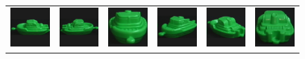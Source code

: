 \begin{figure}[p]
\begin{center}
\begin{tabular}{cccccc}
\includegraphics[width=2cm]{coil/beeld-54.eps} &
\includegraphics[width=2cm]{coil/beeld-55.eps} &
\includegraphics[width=2cm]{coil/beeld-56.eps} &
\includegraphics[width=2cm]{coil/beeld-57.eps} &
\includegraphics[width=2cm]{coil/beeld-58.eps} &
\includegraphics[width=2cm]{coil/beeld-59.eps} \\


\end{tabular}
\end{center}
\end{figure}
